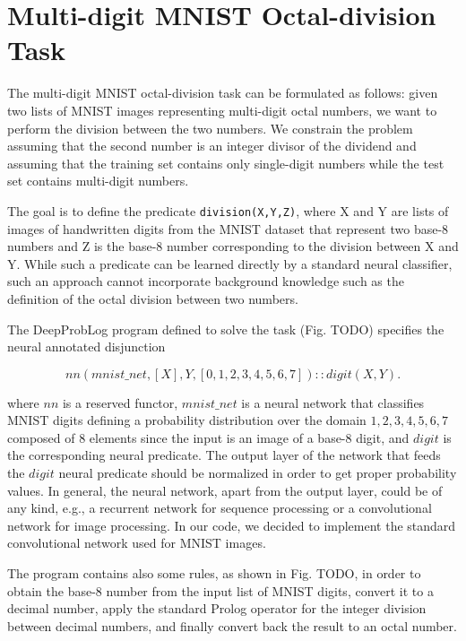 \section{Multi-digit MNIST Octal-division Task}
The multi-digit MNIST octal-division task can be formulated as follows: given two lists of MNIST images representing multi-digit octal numbers, we want to perform the division between the two numbers. We constrain the problem assuming that the second number is an integer divisor of the dividend and assuming that the training set contains only single-digit numbers while the test set contains multi-digit numbers.

The goal is to define the predicate \texttt{division(X,Y,Z)}, where X and Y are lists of images of handwritten digits from the MNIST dataset that represent two base-8 numbers and Z is the base-8 number corresponding to the division between X and Y. While such a predicate can be learned directly by a standard neural classifier, such an approach cannot incorporate background knowledge such as the definition of the octal division between two numbers.

The DeepProbLog program defined to solve the task (Fig. TODO) specifies the neural annotated disjunction

\begin{equation}
    nn(mnist\_net,[X],Y,[0,1,2,3,4,5,6,7]) :: digit(X,Y).
\end{equation}

where $nn$ is a reserved functor, $mnist\_net$ is a neural network that classifies MNIST digits defining a probability distribution over the domain ${1,2,3,4,5,6,7}$ composed of 8 elements since the input is an image of a base-8 digit, and $digit$ is the corresponding neural predicate. The output layer of the network that feeds the $digit$ neural predicate should be normalized in order to get proper probability values. In general, the neural network, apart from the output layer, could be of any kind, e.g., a recurrent network for sequence processing or a convolutional network for image processing. In our code, we decided to implement the standard convolutional network used for MNIST images. %

The program contains also some rules, as shown in Fig. TODO, in order to obtain the base-8 number from the input list of MNIST digits, convert it to a decimal number, apply the standard Prolog operator for the integer division between decimal numbers, and finally convert back the result to an octal number.


